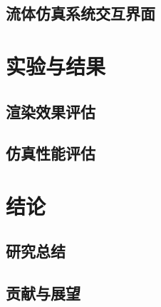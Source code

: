 \section{流体仿真系统交互界面}



\chapter{实验与结果}\label{experiment}

\section{渲染效果评估}
\section{仿真性能评估}


\chapter{结论}

\section{研究总结}
\section{贡献与展望}

